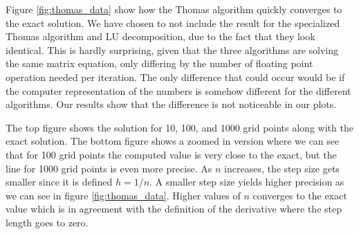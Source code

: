 \documentclass{emulateapj}
\begin{document}
        Figure \ref{fig:thomas_data} show how the Thomas algorithm quickly converges to the exact solution. We have chosen to not include the result for the specialized Thomas algorithm and LU decomposition, due to the fact that they look identical. This is hardly surprising, given that the three algorithms are solving the same matrix equation, only differing by the number of floating point operation needed per iteration. The only difference that could occur would be if the computer representation of the numbers is somehow different for the different algorithms. Our results show that the difference is not noticeable in our plots.
        
        The top figure shows the solution for 10, 100, and 1000 grid points along with the exact solution. The bottom figure shows a zoomed in version where we can see that for 100 grid points the computed value is very close to the exact, but the line for 1000 grid points is even more precise. As \(n\) increases, the step size gets smaller since it is defined \(h = 1/n\). A smaller step size yields higher precision as we can see in figure  \ref{fig:thomas_data}. Higher values of \(n\) converges to the exact value which is in agreement with the definition of the derivative where the step length goes to zero.
        
\end{document}
